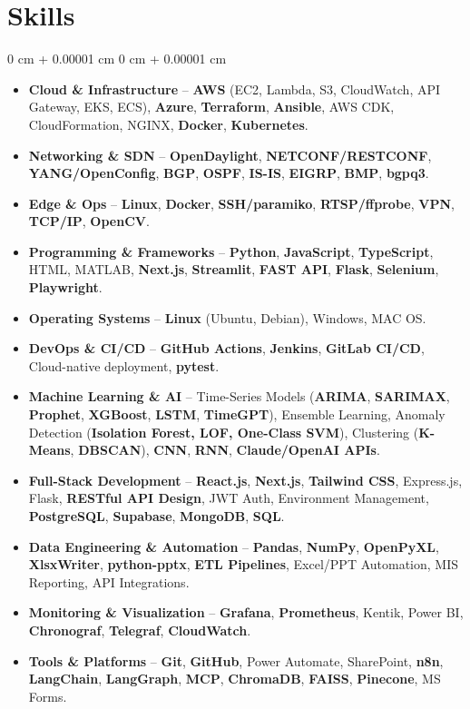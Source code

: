 \documentclass[10pt, letterpaper]{article}
\newenvironment{highlightsforbulletentries}{
    \begin{itemize}[
        topsep=0.10 cm,
        parsep=0.10 cm,
        partopsep=0pt,
        itemsep=0pt,
        leftmargin=10pt
    ]
}{
    \end{itemize}
} %
\newenvironment{onecolentry}{
    \begin{adjustwidth}{
        0 cm + 0.00001 cm
    }{
        0 cm + 0.00001 cm
    }
}{
    \end{adjustwidth}
} %
\begin{document}
 \section{Skills}
\begin{onecolentry}
    \begin{highlightsforbulletentries}
        \item \textbf{Cloud \& Infrastructure} – \textbf{AWS} (EC2, Lambda, S3, CloudWatch, API Gateway, EKS, ECS), \textbf{Azure}, \textbf{Terraform}, \textbf{Ansible}, AWS CDK, CloudFormation, NGINX, \textbf{Docker}, \textbf{Kubernetes}.
        \item \textbf{Networking \& SDN} – \textbf{OpenDaylight}, \textbf{NETCONF/RESTCONF}, \textbf{YANG/OpenConfig}, \textbf{BGP}, \textbf{OSPF}, \textbf{IS-IS}, \textbf{EIGRP}, \textbf{BMP}, \textbf{bgpq3}.
        \item \textbf{Edge \& Ops} – \textbf{Linux}, \textbf{Docker}, \textbf{SSH/paramiko}, \textbf{RTSP/ffprobe}, \textbf{VPN}, \textbf{TCP/IP}, \textbf{OpenCV}.
        \item \textbf{Programming \& Frameworks} – \textbf{Python}, \textbf{JavaScript}, \textbf{TypeScript}, HTML, MATLAB, \textbf{Next.js}, \textbf{Streamlit}, \textbf{FAST API}, \textbf{Flask}, \textbf{Selenium}, \textbf{Playwright}.
        \item \textbf{Operating Systems} – \textbf{Linux} (Ubuntu, Debian), Windows, MAC OS.
        \item \textbf{DevOps \& CI/CD} – \textbf{GitHub Actions}, \textbf{Jenkins}, \textbf{GitLab CI/CD}, Cloud-native deployment, \textbf{pytest}.
        \item \textbf{Machine Learning \& AI} – Time-Series Models (\textbf{ARIMA}, \textbf{SARIMAX}, \textbf{Prophet}, \textbf{XGBoost}, \textbf{LSTM}, \textbf{TimeGPT}), Ensemble Learning, Anomaly Detection (\textbf{Isolation Forest, LOF, One-Class SVM}), Clustering (\textbf{K-Means}, \textbf{DBSCAN}), \textbf{CNN}, \textbf{RNN}, \textbf{Claude/OpenAI APIs}.
        \item \textbf{Full-Stack Development} – \textbf{React.js}, \textbf{Next.js}, \textbf{Tailwind CSS}, Express.js, Flask, \textbf{RESTful API Design}, JWT Auth, Environment Management, \textbf{PostgreSQL}, \textbf{Supabase}, \textbf{MongoDB}, \textbf{SQL}.
        \item \textbf{Data Engineering \& Automation} – \textbf{Pandas}, \textbf{NumPy}, \textbf{OpenPyXL}, \textbf{XlsxWriter}, \textbf{python-pptx}, \textbf{ETL Pipelines}, Excel/PPT Automation, MIS Reporting, API Integrations.
        \item \textbf{Monitoring \& Visualization} – \textbf{Grafana}, \textbf{Prometheus}, Kentik, Power BI, \textbf{Chronograf}, \textbf{Telegraf}, \textbf{CloudWatch}.
        \item \textbf{Tools \& Platforms} – \textbf{Git}, \textbf{GitHub}, Power Automate, SharePoint, \textbf{n8n}, \textbf{LangChain}, \textbf{LangGraph}, \textbf{MCP}, \textbf{ChromaDB}, \textbf{FAISS}, \textbf{Pinecone}, MS Forms.
    \end{highlightsforbulletentries}
\end{onecolentry}
\end{document}
